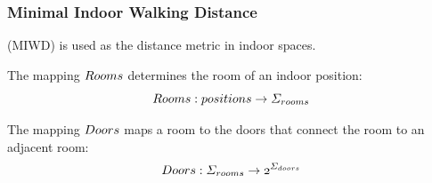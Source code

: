 \begin{frame}
\frametitle{Minimal Indoor Walking Distance}

(MIWD) is used as the distance metric in indoor spaces.
\pause

The mapping $\mathnormal{Rooms}$ determines the room of an indoor position:
\pause
\begin{equation}
\mathnormal{Rooms: positions \rightarrow \Sigma_{rooms}}
\end{equation}

\pause

The mapping $\mathnormal{Doors}$ maps a room to the doors that connect the room to an adjacent room:
\pause
\begin{equation}
\mathnormal{Doors: \Sigma_{rooms} \rightarrow 2^{\Sigma_{doors}}}
\end{equation}

\end{frame}


